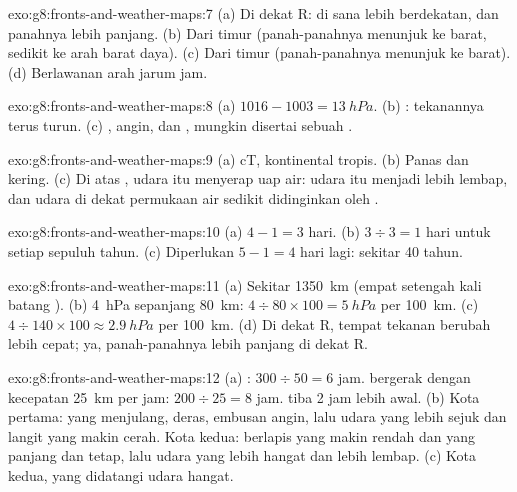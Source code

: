 \begin{solution}{exo:g8:fronts-and-weather-maps:7}
(a) Di dekat R: di sana  lebih berdekatan, dan panahnya
lebih panjang. (b) Dari timur (panah-panahnya menunjuk ke barat, sedikit
ke arah barat daya). (c) Dari timur (panah-panahnya menunjuk ke barat).
(d) Berlawanan arah jarum jam.
\end{solution}

\begin{solution}{exo:g8:fronts-and-weather-maps:8}
(a) $1016 - 1003 = \qty{13}{hPa}$. (b) : tekanannya terus turun.
(c) , angin, dan , mungkin disertai sebuah .
\end{solution}

\begin{solution}{exo:g8:fronts-and-weather-maps:9}
(a) cT, kontinental tropis. (b) Panas dan kering. (c) Di atas , udara
itu menyerap uap air: udara itu menjadi lebih lembap, dan udara di dekat
permukaan air sedikit didinginkan oleh .
\end{solution}

\begin{solution}{exo:g8:fronts-and-weather-maps:10}
(a) $4 - 1 = 3$ hari. (b) $3 \div 3 = 1$ hari untuk setiap sepuluh tahun.
(c) Diperlukan $5 - 1 = 4$ hari lagi: sekitar 40 tahun.
\end{solution}

\begin{solution}{exo:g8:fronts-and-weather-maps:11}
(a) Sekitar \qty{1350}{km} (empat setengah kali batang ). (b)
\qty{4}{hPa} sepanjang \qty{80}{km}:
$4 \div 80 \times 100 = \qty{5}{hPa}$ per \qty{100}{km}.
(c) $4 \div 140 \times 100 \approx \qty{2.9}{hPa}$ per \qty{100}{km}. (d) Di dekat R, tempat tekanan berubah
lebih cepat; ya, panah-panahnya lebih panjang di dekat R.
\end{solution}

\begin{solution}{exo:g8:fronts-and-weather-maps:12}
(a) : $300 \div 50 = 6$ jam.  bergerak dengan
kecepatan \qty{25}{km} per jam: $200 \div 25 = 8$ jam.  tiba
2 jam lebih awal. (b) Kota pertama:  yang menjulang,  deras,
embusan angin, lalu udara yang lebih sejuk dan langit yang makin cerah.
Kota kedua:  berlapis yang makin rendah dan  yang panjang dan
tetap, lalu udara yang lebih hangat dan lebih lembap. (c) Kota kedua,
yang didatangi udara hangat.
\end{solution}

